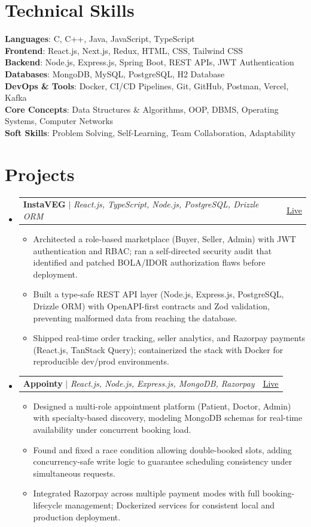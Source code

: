 \documentclass[letterpaper,11pt]{article}
\makeatletter
\newcommand{\resumeItem}[1]{
  \item\small{
    {#1 \vspace{-4pt}}
  }
}
\newcommand{\resumeProjectHeading}[2]{
    \item
    \begin{tabular*}{0.97\textwidth}{l@{\extracolsep{\fill}}r}
      \small#1 & #2 \\
    \end{tabular*}\vspace{-9pt}
}
\newcommand{\resumeSubHeadingListStart}{\begin{itemize}[leftmargin=0.15in, label={}]}
\newcommand{\resumeSubHeadingListEnd}{\end{itemize}}
\newcommand{\resumeItemListStart}{\begin{itemize}[label=$\vcenter{\hbox{\tiny$\bullet$}}$]}
\newcommand{\resumeItemListEnd}{\end{itemize}\vspace{-7pt}}
\makeatother
\begin{document}
  \section{Technical Skills}
 \begin{itemize}[leftmargin=0.15in, label={}]
    \small{\item{
     \textbf{Languages}{: C, C++, Java, JavaScript, TypeScript} \\
     \textbf{Frontend}{: React.js, Next.js, Redux, HTML, CSS, Tailwind CSS} \\
     \textbf{Backend}{: Node.js, Express.js, Spring Boot, REST APIs, JWT Authentication} \\
     \textbf{Databases}{: MongoDB, MySQL, PostgreSQL, H2 Database} \\
     \textbf{DevOps \& Tools}{: Docker, CI/CD Pipelines, Git, GitHub, Postman, Vercel, Kafka} \\
     \textbf{Core Concepts}{: Data Structures \& Algorithms, OOP, DBMS, Operating Systems, Computer Networks} \\
     \textbf{Soft Skills}{: Problem Solving, Self-Learning, Team Collaboration, Adaptability} \\
    }}
 \end{itemize}


\section{Projects}
\resumeSubHeadingListStart
\resumeProjectHeading
{\textbf{InstaVEG} $|$ \emph{React.js, TypeScript, Node.js, PostgreSQL, Drizzle ORM}}{\href{https://green-mart-connect--mnvj69.replit.app/}{\underline{Live}}}
\resumeItemListStart
\resumeItem{Architected a role-based marketplace (Buyer, Seller, Admin) with JWT authentication and RBAC; ran a self-directed security audit that identified and patched BOLA/IDOR authorization flaws before deployment.}
\resumeItem{Built a type-safe REST API layer (Node.js, Express.js, PostgreSQL, Drizzle ORM) with OpenAPI-first contracts and Zod validation, preventing malformed data from reaching the database.}
\resumeItem{Shipped real-time order tracking, seller analytics, and Razorpay payments (React.js, TanStack Query); containerized the stack with Docker for reproducible dev/prod environments.}
\resumeItemListEnd

\resumeProjectHeading
{\textbf{Appointy} $|$ \emph{React.js, Node.js, Express.js, MongoDB, Razorpay}}{\href{https://appointy-roan.vercel.app/}{\underline{Live}}}
\resumeItemListStart
\resumeItem{Designed a multi-role appointment platform (Patient, Doctor, Admin) with specialty-based discovery, modeling MongoDB schemas for real-time availability under concurrent booking load.}
\resumeItem{Found and fixed a race condition allowing double-booked slots, adding concurrency-safe write logic to guarantee scheduling consistency under simultaneous requests.}
\resumeItem{Integrated Razorpay across multiple payment modes with full booking-lifecycle management; Dockerized services for consistent local and production deployment.}
\resumeItemListEnd
\resumeSubHeadingListEnd
\end{document}
